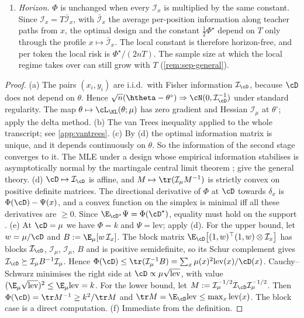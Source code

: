 \begin{theorem}
\begin{enumerate}[label=(\alph*),leftmargin=*]
\cref{thm:separable}.
\item \Pv\Ck \emph{Horizon.} $\Phi$ is unchanged when every $\mathcal I_x$ is multiplied by the same constant.
Since $\mathcal I_x=T\bar{\mathcal I}_x$, with $\bar{\mathcal I}_x$ the average per-position information along teacher paths
from $x$, the optimal design and the constant $\frac12\Phi^\star$ depend on $T$ only through the profile
$x\mapsto\bar{\mathcal I}_x$. The local constant is therefore horizon-free, and per token the local risk is
$\Phi^\star/(2nT)$. The sample size at which the local regime takes over can still grow with $T$
(\cref{rem:sep-general}).
\end{enumerate}
\end{theorem}
\begin{proof}
(a) The pairs $(x_i,y_i)$ are i.i.d.\ with Fisher information $\mathcal I_\cD$, because $\cD$ does not depend on
$\theta$. Hence $\sqrt n(\htheta-\theta^\circ)\Rightarrow\cN(0,\mathcal I_\cD^{-1})$ under standard regularity. The map
$\theta\mapsto\cL_\KL(\theta;\mu)$ has zero gradient and Hessian $\mathcal I_\mu$ at $\theta^\circ$; apply the delta method.
(b) The van Trees inequality applied to the whole transcript; see \cref{app:vantrees}.
(c) By (d) the optimal information matrix is unique, and it depends continuously on $\theta$. So the
information of the second stage converges to it. The MLE under a design whose empirical information
stabilises is asymptotically normal by the martingale central limit theorem
\citep{chaudhuri1993nonlinear}; \citet{pronzato2013design} give the general theory.
(d) $\cD\mapsto\mathcal I_\cD$ is affine, and $M\mapsto\tr(\mathcal I_\mu M^{-1})$ is strictly convex on positive definite
matrices. The directional derivative of $\Phi$ at $\cD$ towards $\delta_x$ is $\Phi(\cD)-\Psi(x)$, and a convex
function on the simplex is minimal iff all these derivatives are $\ge0$. Since $\E_{\cD^\star}\Psi=\Phi(\cD^\star)$,
equality must hold on the support \citep{kiefer1974general}.
(e) At $\cD=\mu$ we have $\Phi=k$ and $\Psi=\mathrm{lev}$; apply (d). For the upper bound, let $w=\mu/\cD$ and
$B:=\E_\mu[w\,\mathcal I_x]$. The block matrix $\E_\cD\big[(1,w)^\top(1,w)\otimes\mathcal I_x\big]$ has blocks $\mathcal I_\cD$,
$\mathcal I_\mu$, $\mathcal I_\mu$, $B$ and is positive semidefinite, so its Schur complement gives $\mathcal I_\cD\succeq\mathcal I_\mu B^{-1}\mathcal I_\mu$.
Hence $\Phi(\cD)\le\tr(\mathcal I_\mu^{-1}B)=\sum_x\mu(x)^2\mathrm{lev}(x)/\cD(x)$. Cauchy--Schwarz minimises the right side at
$\cD\propto\mu\sqrt{\mathrm{lev}}$, with value $(\E_\mu\sqrt{\mathrm{lev}})^2\le\E_\mu\mathrm{lev}=k$. For the lower bound, let
$M:=\mathcal I_\mu^{-1/2}\mathcal I_\cD\mathcal I_\mu^{-1/2}$. Then $\Phi(\cD)=\tr M^{-1}\ge k^2/\tr M$ and $\tr M=\E_\cD\mathrm{lev}\le\max_x\mathrm{lev}(x)$.
The block case is a direct computation.
(f) Immediate from the definition.
\end{proof}

